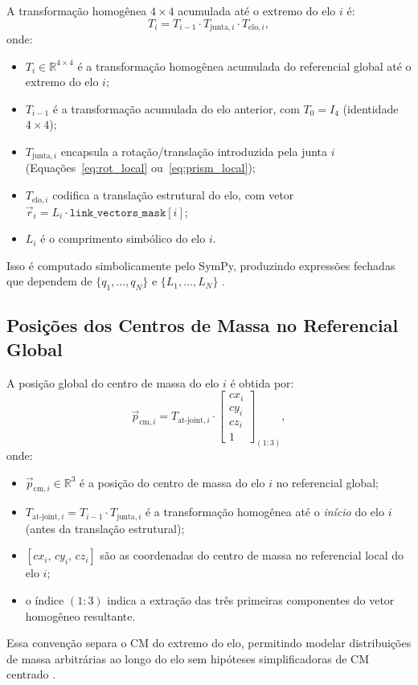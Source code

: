 A transformação homogênea $4 \times 4$ acumulada até o extremo do elo $i$ é:
\begin{equation}
    T_i = T_{i-1} \cdot T_{\text{junta},i} \cdot T_{\text{elo},i},
    \label{eq:T_acumulada}
\end{equation}
onde:
\begin{itemize}
    \item $T_i \in \mathbb{R}^{4\times 4}$ é a transformação homogênea acumulada do referencial global até o extremo do elo $i$;
    \item $T_{i-1}$ é a transformação acumulada do elo anterior, com $T_0 = I_4$ (identidade $4\times 4$);
    \item $T_{\text{junta},i}$ encapsula a rotação/translação introduzida pela junta $i$ (Equações~\eqref{eq:rot_local} ou~\eqref{eq:prism_local});
    \item $T_{\text{elo},i}$ codifica a translação estrutural do elo, com vetor $\vec{r}_i = L_i \cdot \texttt{link\_vectors\_mask}[i]$;
    \item $L_i$ é o comprimento simbólico do elo $i$.
\end{itemize}
Isso é computado simbolicamente pelo SymPy, produzindo expressões fechadas que dependem de $\{q_1, \ldots, q_N\}$ e $\{L_1, \ldots, L_N\}$ \cite{spong2020robot}.

\subsection{Posições dos Centros de Massa no Referencial Global}

A posição global do centro de massa do elo $i$ é obtida por:
\begin{equation}
    \vec{p}_{\text{cm},i} = T_{\text{at-joint},i} \cdot \begin{bmatrix} cx_i \\ cy_i \\ cz_i \\ 1 \end{bmatrix}_{\!(1:3)},
    \label{eq:pcm_global}
\end{equation}
onde:
\begin{itemize}
    \item $\vec{p}_{\text{cm},i} \in \mathbb{R}^{3}$ é a posição do centro de massa do elo $i$ no referencial global;
    \item $T_{\text{at-joint},i} = T_{i-1} \cdot T_{\text{junta},i}$ é a transformação homogênea até o \emph{início} do elo $i$ (antes da translação estrutural);
    \item $[cx_i,\, cy_i,\, cz_i]$ são as coordenadas do centro de massa no referencial local do elo $i$;
    \item o índice $(1:3)$ indica a extração das três primeiras componentes do vetor homogêneo resultante.
\end{itemize}
Essa convenção separa o CM do extremo do elo, permitindo modelar distribuições de massa arbitrárias ao longo do elo sem hipóteses simplificadoras de CM centrado \cite{siciliano2009robotics, spong2020robot}.

